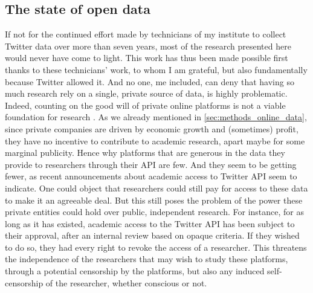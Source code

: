 \documentclass[../thesis.tex]{subfiles}
\begin{document}
\subsection{The state of open data}
If not for the continued effort made by technicians of my institute to collect Twitter
data over more than seven years, most of the research presented here would never have
come to light. This work has thus been made possible first thanks to these technicians'
work, to whom I am grateful, but also fundamentally because Twitter allowed it. And no
one, me included, can deny that having so much research rely on a single, private source
of data, is highly problematic. Indeed, counting on the good will of private online
platforms is not a viable foundation for research
\cite{AusloosOperationalizingResearch2020}. As we already mentioned in
\cref{sec:methods_online_data}, since private companies are driven by economic growth and
(sometimes) profit, they have no incentive to contribute to academic
research, apart maybe for some marginal publicity. Hence why platforms that are generous in
the data they provide to researchers through their \ac{API} are few. And they seem to be
getting fewer, as recent announcements about academic access to Twitter \ac{API} seem to
indicate. One could object that researchers could still pay for access to these data to
make it an agreeable deal. But this still poses the problem of the power these private
entities could hold over public, independent research. For instance, for as long as it
has existed, academic access to the Twitter \ac{API} has been subject to their approval,
after an internal review based on opaque criteria. If they wished to do so, they had
every right to revoke the access of a researcher. This threatens the independence of the
researchers that may wish to study these platforms, through a potential censorship by
the platforms, but also any induced self-censorship of the researcher, whether conscious
or not.
\end{document}
